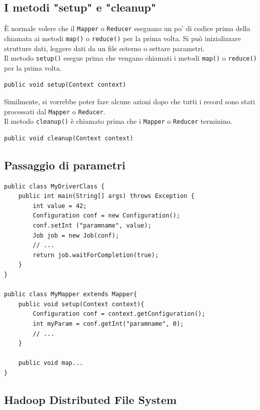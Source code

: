 \documentclass{article}
\begin{document}
\begin{appendices}
\subsection{I metodi "setup" e "cleanup"}
È normale volere che il \texttt{Mapper} o \texttt{Reducer} eseguano un po' di codice prima della chiamata ai metodi \texttt{map()} o \texttt{reduce()} per la prima volta. Si può inizializzare strutture dati, leggere dati da un file esterno o settare parametri. \\
Il metodo \texttt{setup()} esegue prima che vengano chiamati i metodi \texttt{map()} o \texttt{reduce()} per la prima volta.
\begin{lstlisting}
public void setup(Context context)
\end{lstlisting}
Similmente, si vorrebbe poter fare alcune azioni dopo che tutti i record sono stati processati dal \texttt{Mapper} o \texttt{Reducer}. \\
Il metodo \texttt{cleanup()} è chiamato prima che i \texttt{Mapper} o \texttt{Reducer} terminino.
\begin{lstlisting}
public void cleanup(Context context)
\end{lstlisting}

\subsection{Passaggio di parametri}
\begin{lstlisting}
public class MyDriverClass {
    public int main(String[] args) throws Exception {
        int value = 42;
        Configuration conf = new Configuration();
        conf.setInt ("paramname", value);
        Job job = new Job(conf);
        // ...
        return job.waitForCompletion(true);
    }
}

public class MyMapper extends Mapper{
    public void setup(Context context){
        Configuration conf = context.getConfiguration(); 
        int myParam = conf.getInt("paramname", 0);
        // ...
    }
    
    public void map...
}
\end{lstlisting}

\subsection{Hadoop Distributed File System}


\end{appendices}
\end{document}
